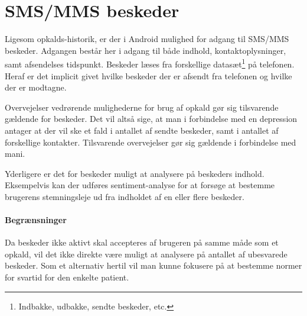 \section{SMS/MMS beskeder}\label{datasamling:smsmms}
Ligesom opkalds-historik, er der i Android mulighed for adgang til SMS/MMS beskeder.
Adgangen består her i adgang til både indhold, kontaktoplysninger, samt afsendelses tidspunkt.
Beskeder læses fra forskellige datasæt\footnote{Indbakke, udbakke, sendte beskeder, etc.} på telefonen.
Heraf er det implicit givet hvilke beskeder der er afsendt fra telefonen og hvilke der er modtagne.

Overvejelser vedrørende mulighederne for brug af opkald gør sig tilsvarende gældende for beskeder.
Det vil altså sige, at man i forbindelse med en depression antager at der vil ske et fald i antallet af sendte beskeder, samt i antallet af forskellige kontakter.
Tilsvarende overvejelser gør sig gældende i forbindelse med mani.

Yderligere er det for beskeder muligt at analysere på beskeders indhold.
Eksempelvis kan der udføres sentiment-analyse\cite{sentiment_analysis} for at forsøge at bestemme brugerens stemningsleje ud fra indholdet af en eller flere beskeder.

\paragraph{Begrænsninger}
Da beskeder ikke aktivt skal accepteres af brugeren på samme måde som et opkald, vil det ikke direkte være muligt at analysere på antallet af ubesvarede beskeder.
Som et alternativ hertil vil man kunne fokusere på at bestemme normer for svartid for den enkelte patient.
